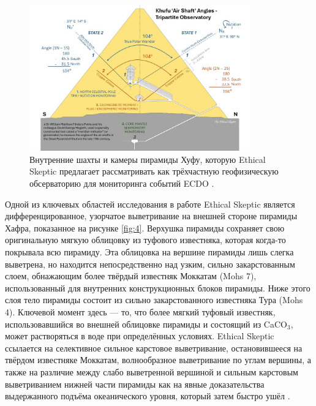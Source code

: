 \documentclass[10pt,twocolumn,letterpaper]{article}
\begin{document}
\begin{figure}[b]
\begin{center}
\includegraphics[width=0.85\textwidth]{shafts.jpg}
\end{center}
   \caption{Внутренние шахты и камеры пирамиды Хуфу, которую Ethical Skeptic предлагает рассматривать как трёхчастную геофизическую обсерваторию для мониторинга событий ECDO \cite{28}.}
\label{fig:5}
\end{figure}

Одной из ключевых областей исследования в работе Ethical Skeptic является дифференцированное, узорчатое выветривание на внешней стороне пирамиды Хафра, показанное на рисунке \ref{fig:4}. Верхушка пирамиды сохраняет свою оригинальную мягкую облицовку из туфового известняка, которая когда-то покрывала всю пирамиду. Эта облицовка на вершине пирамиды лишь слегка выветрена, но находится непосредственно над узким, сильно закарстованным слоем, обнажающим более твёрдый известняк Моккатам (Mohs 7), использованный для внутренних конструкционных блоков пирамиды. Ниже этого слоя тело пирамиды состоит из сильно закарстованного известняка Тура (Mohs 4). Ключевой момент здесь — то, что более мягкий туфовый известняк, использовавшийся во внешней облицовке пирамиды и состоящий из CaCO$_3$, может растворяться в воде при определённых условиях. Ethical Skeptic ссылается на селективное сильное карстовое выветривание, остановившееся на твёрдом известняке Моккатам, волнообразное выветривание по углам вершины, а также на различие между слабо выветренной вершиной и сильным карстовым выветриванием нижней части пирамиды как на явные доказательства выдержанного подъёма океанического уровня, который затем быстро ушёл \cite{27}.
\end{document}
